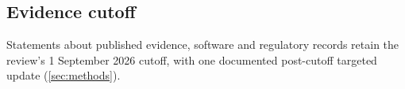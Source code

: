 \documentclass[11pt,a4paper]{article}
\begin{document}
\subsection*{Evidence cutoff}
Statements about published evidence, software and regulatory records retain the review's
1 September 2026 cutoff, with one documented post-cutoff targeted update (\cref{sec:methods}).

\par\bigskip
\setlength{\bibsep}{2pt}


\end{document}
